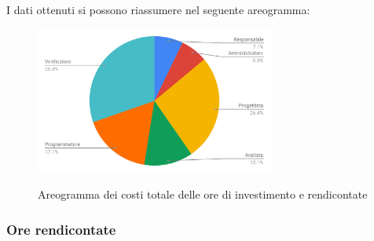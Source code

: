 \pagebreak
I dati ottenuti si possono riassumere nel seguente areogramma:
\begin{figure}[H] 
			\centering 
				\includegraphics[width=0.7\textwidth]{res/images/areogramma_riepilogo.pdf}\\
				\caption{Areogramma dei costi totale delle ore di investimento e rendicontate}
			\label{AreogrammaRiepilogoRuoli}
\end{figure}


\subsubsection{Ore rendicontate}
